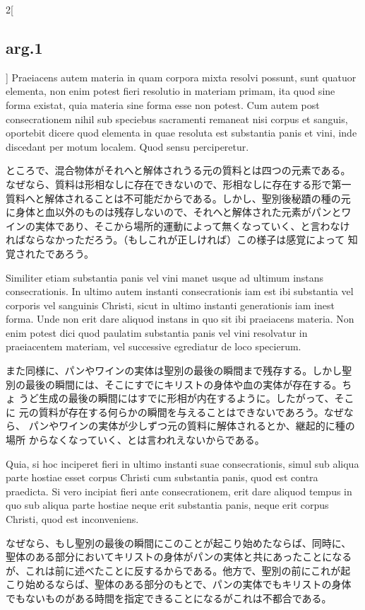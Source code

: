 \documentclass[paper=a4paper,fontsize=10pt,jafontsize=9pt,titlepage]{jlreq}
\begin{document}
\begin{paracol}{2}[\subsection{arg.1}]
Praeiacens autem materia in quam corpora mixta resolvi possunt, sunt
quatuor elementa, non enim potest fieri resolutio in materiam primam,
ita quod sine forma existat, quia materia sine forma esse non
potest. Cum autem post consecrationem nihil sub speciebus sacramenti
remaneat nisi corpus et sanguis, oportebit dicere quod elementa in
quae resoluta est substantia panis et vini, inde discedant per motum
localem. Quod sensu perciperetur.

\switchcolumn

ところで、混合物体がそれへと解体されうる元の質料とは四つの元素である。
なぜなら、質料は形相なしに存在できないので、形相なしに存在する形で第一
質料へと解体されることは不可能だからである。しかし、聖別後秘蹟の種の元
に身体と血以外のものは残存しないので、それへと解体された元素がパンとワ
インの実体であり、そこから場所的運動によって無くなっていく、と言わなけ
ればならなかっただろう。（もしこれが正しければ）この様子は感覚によって
知覚されたであろう。

\switchcolumn*

Similiter etiam substantia panis vel vini manet usque ad ultimum
instans consecrationis. In ultimo autem instanti consecrationis iam
est ibi substantia vel corporis vel sanguinis Christi, sicut in ultimo
instanti generationis iam inest forma. Unde non erit dare aliquod
instans in quo sit ibi praeiacens materia. Non enim potest dici quod
paulatim substantia panis vel vini resolvatur in praeiacentem
materiam, vel successive egrediatur de loco specierum.

\switchcolumn

また同様に、パンやワインの実体は聖別の最後の瞬間まで残存する。しかし聖
別の最後の瞬間には、そこにすでにキリストの身体や血の実体が存在する。ちょ
うど生成の最後の瞬間にはすでに形相が内在するように。したがって、そこに
元の質料が存在する何らかの瞬間を与えることはできないであろう。なぜなら、
パンやワインの実体が少しずつ元の質料に解体されるとか、継起的に種の場所
からなくなっていく、とは言われえないからである。

\switchcolumn*

Quia, si hoc inciperet fieri in ultimo instanti suae consecrationis,
simul sub aliqua parte hostiae esset corpus Christi cum substantia
panis, quod est contra praedicta. Si vero incipiat fieri ante
consecrationem, erit dare aliquod tempus in quo sub aliqua parte
hostiae neque erit substantia panis, neque erit corpus Christi, quod
est inconveniens.

\switchcolumn

なぜなら、もし聖別の最後の瞬間にこのことが起こり始めたならば、同時に、
聖体のある部分においてキリストの身体がパンの実体と共にあったことになる
が、これは前に述べたことに反するからである。他方で、聖別の前にこれが起
こり始めるならば、聖体のある部分のもとで、パンの実体でもキリストの身体
でもないものがある時間を指定できることになるがこれは不都合である。


\end{paracol}
\end{document}
